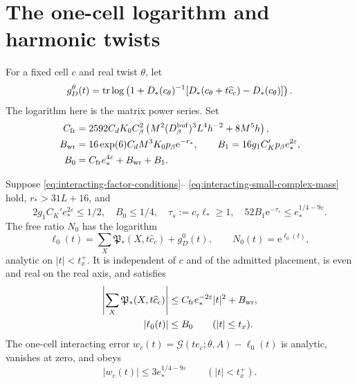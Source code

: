 \section{The one-cell logarithm and harmonic twists}
\label{subsec:interacting-one-cell}

For a fixed cell $c$ and real twist $\theta$, let
\begin{equation}\label{eq:interacting-free-coarse-log}
 g_D^\theta(t)=\operatorname{tr}\log\left(1+D_*(c_\theta)^{-1}
                   [D_*(c_\theta+t\widehat c_c)-D_*(c_\theta)]\right).
\end{equation}
The logarithm here is the matrix power series.
Set
\begin{align}
 C_{\rm fr}&=2592C_dK_0C_\beta^2
       \left(M^2(D_\beta^{\rm buf})^3L^4h^{-2}+8M^5h\right),
                                                   \notag\\
 B_{\rm wr}&=16\exp(6)C_dM^3K_0p_\beta \mathrm e^{-r_*},
 \qquad B_1=16g_1C_K'p_\beta e_*^{2\varepsilon},       \notag\\
 B_0&=C_{\rm fr}e_*^{4\varepsilon}+B_{\rm wr}+B_1 .
                                \label{eq:interacting-free-log-constants}
\end{align}

\begin{proposition}\label{prop:interacting-one-cell}
Suppose \eqref{eq:interacting-factor-conditions}--%
\eqref{eq:interacting-small-complex-mass} hold,
$r_*>31L+16$, and
\begin{equation}\label{eq:interacting-one-cell-conditions}
 2g_1C_K'e_*^{2\varepsilon}\le1/2,\quad
 B_0\le1/4,\quad
 \tau_s:=c_\tau\ell_*\ge1,\quad
 52B_1\mathrm e^{-\tau_s}\le e_*^{1/4-9\varepsilon}.
\end{equation}
The free ratio $N_0$ has the logarithm
\begin{equation}\label{eq:interacting-one-cell-free-log}
 \ell_0(t)=\sum_X\mathfrak P_*(X,t\widehat c_c)+g_D^0(t),
 \qquad N_0(t)=\mathrm e^{\ell_0(t)} ,
\end{equation}
analytic on $|t|<t_x^+$. It is independent of
$c$ and of the admitted placement, is even
and real on the real axis, and satisfies
\begin{align}
 \left|\sum_X\mathfrak P_*(X,t\widehat c_c)\right|
        &\le C_{\rm fr}e_*^{-2\varepsilon}|t|^2+B_{\rm wr},
                                  \label{eq:interacting-P-probe-gain}\\
 |\ell_0(t)|&\le B_0\qquad(|t|\le t_x).
                                  \label{eq:interacting-free-log-bound}
\end{align}
The one-cell interacting error
$w_c(t)=\mathcal G(te_c;\theta,A)-\ell_0(t)$
is analytic, vanishes at zero, and obeys
\begin{equation}\label{eq:interacting-one-cell-error}
 |w_c(t)|\le3e_*^{1/4-9\varepsilon}
                         \qquad(|t|<t_x^+).
\end{equation}
\end{proposition}

